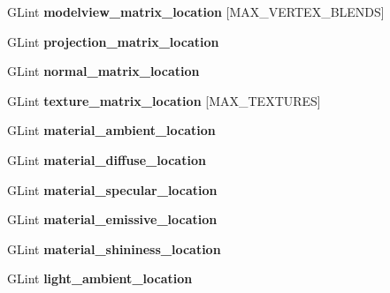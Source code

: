 \begin{DoxyCompactItemize}
G\+Lint {\bfseries modelview\+\_\+matrix\+\_\+location} \mbox{[}M\+A\+X\+\_\+\+V\+E\+R\+T\+E\+X\+\_\+\+B\+L\+E\+N\+DS\mbox{]}
\item 
\mbox{\label{structglsl__vs__program_a685b1e2555dc26c70fafc3dcf5908732}} 
G\+Lint {\bfseries projection\+\_\+matrix\+\_\+location}
\item 
\mbox{\label{structglsl__vs__program_a945a4f0e4fd2205346e0b1042771f32f}} 
G\+Lint {\bfseries normal\+\_\+matrix\+\_\+location}
\item 
\mbox{\label{structglsl__vs__program_a9a762d64c77e600b8a7788ac4c34eca7}} 
G\+Lint {\bfseries texture\+\_\+matrix\+\_\+location} \mbox{[}M\+A\+X\+\_\+\+T\+E\+X\+T\+U\+R\+ES\mbox{]}
\item 
\mbox{\label{structglsl__vs__program_aec33b738317caeeec45b6fb4cd3502ea}} 
G\+Lint {\bfseries material\+\_\+ambient\+\_\+location}
\item 
\mbox{\label{structglsl__vs__program_ab8f53a34d7651e9f90eb630563fc8fd3}} 
G\+Lint {\bfseries material\+\_\+diffuse\+\_\+location}
\item 
\mbox{\label{structglsl__vs__program_ad358c7c883b583e710d148a29e11729b}} 
G\+Lint {\bfseries material\+\_\+specular\+\_\+location}
\item 
\mbox{\label{structglsl__vs__program_abdd0d9cdc9260056815695fda6da3a4b}} 
G\+Lint {\bfseries material\+\_\+emissive\+\_\+location}
\item 
\mbox{\label{structglsl__vs__program_ab0af55d9df00175f8b7c7eb0cc4f627a}} 
G\+Lint {\bfseries material\+\_\+shininess\+\_\+location}
\item 
\mbox{\label{structglsl__vs__program_a9b41ac281eb690ede7fefb6a678b876c}} 
G\+Lint {\bfseries light\+\_\+ambient\+\_\+location}
\item 
\mbox{\label{structglsl__vs__program_a2e9ed37eb0199e5d853f3cc0ffce675f}} 
\begin{tabbing}

\end{tabbing}
\end{DoxyCompactItemize}
